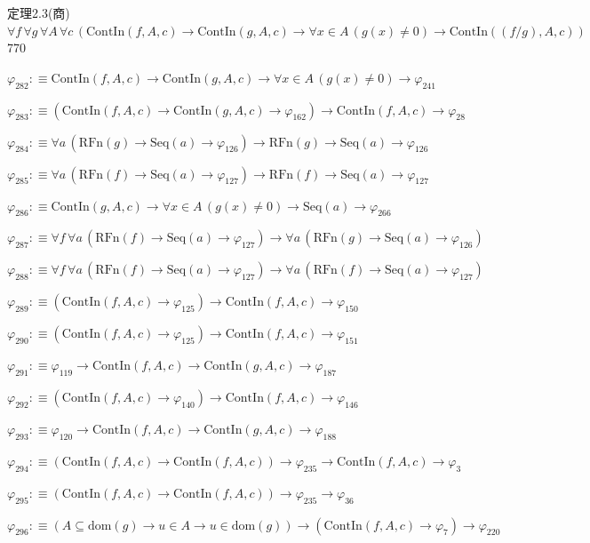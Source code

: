 \begin{fullproof}{定理2.3(商)}{$\forall f\,\forall g\,\forall A\,\forall c\,(\mathrm{ContIn}(f,A,c) \to \mathrm{ContIn}(g,A,c) \to \forall x \in A\,(g(x) \neq 0) \to \mathrm{ContIn}((f / g),A,c))$}{770}
\begin{abbrevlist}
\item $\varphi_{282} :\equiv \mathrm{ContIn}(f,A,c) \to \mathrm{ContIn}(g,A,c) \to \forall x \in A\,(g(x) \neq 0) \to \varphi_{241}$
\item $\varphi_{283} :\equiv (\mathrm{ContIn}(f,A,c) \to \mathrm{ContIn}(g,A,c) \to \varphi_{162}) \to \mathrm{ContIn}(f,A,c) \to \varphi_{28}$
\item $\varphi_{284} :\equiv \forall a\,(\mathrm{RFn}(g) \to \mathrm{Seq}(a) \to \varphi_{126}) \to \mathrm{RFn}(g) \to \mathrm{Seq}(a) \to \varphi_{126}$
\item $\varphi_{285} :\equiv \forall a\,(\mathrm{RFn}(f) \to \mathrm{Seq}(a) \to \varphi_{127}) \to \mathrm{RFn}(f) \to \mathrm{Seq}(a) \to \varphi_{127}$
\item $\varphi_{286} :\equiv \mathrm{ContIn}(g,A,c) \to \forall x \in A\,(g(x) \neq 0) \to \mathrm{Seq}(a) \to \varphi_{266}$
\item $\varphi_{287} :\equiv \forall f\,\forall a\,(\mathrm{RFn}(f) \to \mathrm{Seq}(a) \to \varphi_{127}) \to \forall a\,(\mathrm{RFn}(g) \to \mathrm{Seq}(a) \to \varphi_{126})$
\item $\varphi_{288} :\equiv \forall f\,\forall a\,(\mathrm{RFn}(f) \to \mathrm{Seq}(a) \to \varphi_{127}) \to \forall a\,(\mathrm{RFn}(f) \to \mathrm{Seq}(a) \to \varphi_{127})$
\item $\varphi_{289} :\equiv (\mathrm{ContIn}(f,A,c) \to \varphi_{125}) \to \mathrm{ContIn}(f,A,c) \to \varphi_{150}$
\item $\varphi_{290} :\equiv (\mathrm{ContIn}(f,A,c) \to \varphi_{125}) \to \mathrm{ContIn}(f,A,c) \to \varphi_{151}$
\item $\varphi_{291} :\equiv \varphi_{119} \to \mathrm{ContIn}(f,A,c) \to \mathrm{ContIn}(g,A,c) \to \varphi_{187}$
\item $\varphi_{292} :\equiv (\mathrm{ContIn}(f,A,c) \to \varphi_{140}) \to \mathrm{ContIn}(f,A,c) \to \varphi_{146}$
\item $\varphi_{293} :\equiv \varphi_{120} \to \mathrm{ContIn}(f,A,c) \to \mathrm{ContIn}(g,A,c) \to \varphi_{188}$
\item $\varphi_{294} :\equiv (\mathrm{ContIn}(f,A,c) \to \mathrm{ContIn}(f,A,c)) \to \varphi_{235} \to \mathrm{ContIn}(f,A,c) \to \varphi_{3}$
\item $\varphi_{295} :\equiv (\mathrm{ContIn}(f,A,c) \to \mathrm{ContIn}(f,A,c)) \to \varphi_{235} \to \varphi_{36}$
\item $\varphi_{296} :\equiv (A \subseteq \mathrm{dom}(g) \to u \in A \to u \in \mathrm{dom}(g)) \to (\mathrm{ContIn}(f,A,c) \to \varphi_{7}) \to \varphi_{220}$

\end{abbrevlist}
\end{fullproof}
